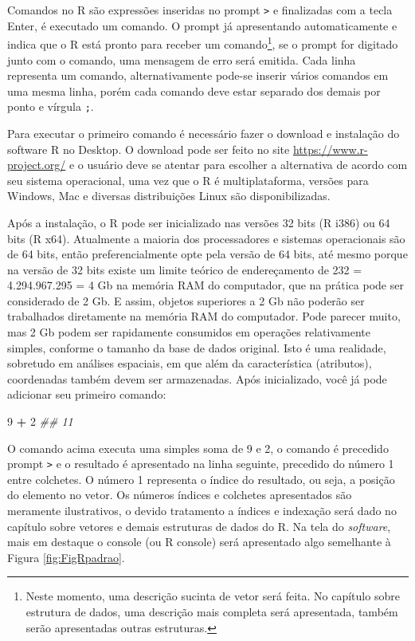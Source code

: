 \documentclass[
  11pt,
  a5paper,
  openany]{book}
\newenvironment{Shaded}{\begin{snugshade}}{\end{snugshade}}
\newcommand{\CommentTok}[1]{\textcolor[rgb]{0.56,0.35,0.01}{\textit{#1}}}
\newcommand{\DecValTok}[1]{\textcolor[rgb]{0.00,0.00,0.81}{#1}}
\newcommand{\OperatorTok}[1]{\textcolor[rgb]{0.81,0.36,0.00}{\textbf{#1}}}
\newcommand{\StringTok}[1]{\textcolor[rgb]{0.31,0.60,0.02}{#1}}
\begin{document}
Comandos no R são expressões inseridas no prompt \texttt{\textgreater{}} e finalizadas com a tecla Enter, é executado um comando. O prompt já apresentando automaticamente e indica que o R está pronto para receber um comando\footnote{Neste momento, uma descrição sucinta de vetor será feita. No capítulo sobre estrutura de dados, uma descrição mais completa será apresentada, também serão apresentadas outras estruturas.}, se o prompt for digitado junto com o comando, uma mensagem de erro será emitida. Cada linha representa um comando, alternativamente pode-se inserir vários comandos em uma mesma linha, porém cada comando deve estar separado dos demais por ponto e vírgula \texttt{;}.

Para executar o primeiro comando é necessário fazer o download e instalação do software R no Desktop. O download pode ser feito no site \url{https://www.r-project.org/} e o usuário deve se atentar para escolher a alternativa de acordo com seu sistema operacional, uma vez que o R é multiplataforma, versões para Windows, Mac e diversas distribuições Linux são disponibilizadas.

Após a instalação, o R pode ser inicializado nas versões 32 bits (R i386) ou 64 bits (R x64). Atualmente a maioria dos processadores e sistemas operacionais são de 64 bits, então preferencialmente opte pela versão de 64 bits, até mesmo porque na versão de 32 bits existe um limite teórico de endereçamento de 232 = 4.294.967.295 = 4 Gb na memória RAM do computador, que na prática pode ser considerado de 2 Gb. E assim, objetos superiores a 2 Gb não poderão ser trabalhados diretamente na memória RAM do computador. Pode parecer muito, mas 2 Gb podem ser rapidamente consumidos em operações relativamente simples, conforme o tamanho da base de dados original. Isto é uma realidade, sobretudo em análises espaciais, em que além da característica (atributos), coordenadas também devem ser armazenadas.
Após inicializado, você já pode adicionar seu primeiro comando:

\begin{Shaded}
\begin{Highlighting}[]
\DecValTok{9} \OperatorTok{+}\StringTok{ }\DecValTok{2}
\CommentTok{## 11}
\end{Highlighting}
\end{Shaded}

O comando acima executa uma simples soma de 9 e 2, o comando é precedido prompt \texttt{\textgreater{}} e o resultado é apresentado na linha seguinte, precedido do número 1 entre colchetes. O número 1 representa o índice do resultado, ou seja, a posição do elemento no vetor. Os números índices e colchetes apresentados são meramente ilustrativos, o devido tratamento a índices e indexação será dado no capítulo sobre vetores e demais estruturas de dados do R. Na tela do \emph{software}, mais em destaque o console (ou R console) será apresentado algo semelhante à Figura \ref{fig:FigRpadrao}.
\end{document}
